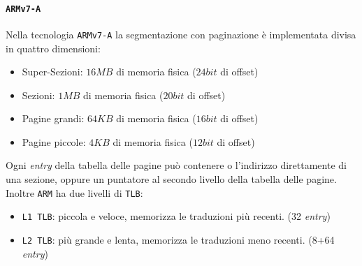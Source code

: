     \paragraph{\texttt{ARMv7-A}}
        Nella tecnologia \texttt{ARMv7-A} la segmentazione con paginazione è implementata divisa in quattro dimensioni:
        \begin{itemize}
            \item Super-Sezioni: $16MB$ di memoria fisica ($24bit$ di offset)
            \item Sezioni: $1MB$ di memoria fisica ($20bit$ di offset)
            \item Pagine grandi: $64KB$ di memoria fisica ($16bit$ di offset)
            \item Pagine piccole: $4KB$ di memoria fisica ($12bit$ di offset)
        \end{itemize}
        Ogni \textit{entry} della tabella delle pagine può contenere o l'indirizzo direttamente di una sezione, oppure un puntatore al secondo livello della tabella delle pagine. Inoltre \texttt{ARM} ha due livelli di \texttt{TLB}:
        \begin{itemize}
            \item \texttt{L1 TLB}: piccola e veloce, memorizza le traduzioni più recenti. (32 \textit{entry})
            \item \texttt{L2 TLB}: più grande e lenta, memorizza le traduzioni meno recenti. (8+64 \textit{entry})
        \end{itemize}